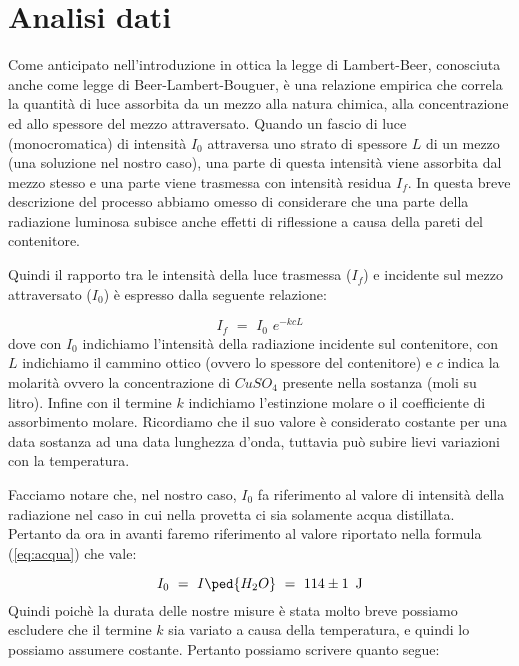 \section{Analisi dati}

Come anticipato nell'introduzione in ottica la legge di Lambert-Beer, conosciuta anche come legge di Beer-Lambert-Bouguer, è una relazione empirica che correla la quantità di luce assorbita da un mezzo alla natura chimica, alla concentrazione ed allo spessore del mezzo attraversato.
Quando un fascio di luce (monocromatica) di intensità $I_0$ attraversa uno strato di spessore $L$ di un mezzo (una soluzione nel nostro caso), una parte di questa intensità viene assorbita dal mezzo stesso e una parte viene trasmessa con intensità residua $I_f$.
In questa breve descrizione del processo abbiamo omesso di considerare che una parte della radiazione luminosa subisce anche effetti di riflessione a causa della pareti del contenitore.

Quindi il rapporto tra le intensità della luce trasmessa ($I_f$) e incidente sul mezzo attraversato ($I_0$) è espresso dalla seguente relazione:

\begin{equation}
	I_f \,\,=\,\, I_0 \,\, e^{-kcL}
	\label{eq:intensita}
\end{equation}
%
dove con $I_0$ indichiamo l'intensità della radiazione incidente sul contenitore, con $L$ indichiamo il cammino ottico (ovvero lo spessore del contenitore) e $c$ indica la molarità ovvero la concentrazione di $CuSO_4$ presente nella sostanza (moli su litro). Infine con il termine $k$ indichiamo l'estinzione molare o il coefficiente di assorbimento molare. Ricordiamo che il suo valore è considerato costante per una data sostanza ad una data lunghezza d'onda, tuttavia può subire lievi variazioni con la temperatura.

Facciamo notare che, nel nostro caso, $I_0$ fa riferimento al valore di intensità della radiazione nel caso in cui nella provetta ci sia solamente acqua distillata. Pertanto da ora in avanti faremo riferimento al valore riportato nella formula (\ref{eq:acqua}) che vale:

\begin{equation}
	I_0 \,\,=\,\, I\ped{H_2O} \,\,=\,\, 114 \pm 1 \,\,\, \si{\joule}
\end{equation}
%
Quindi poichè la durata delle nostre misure è stata molto breve possiamo escludere che il termine $k$ sia variato a causa della temperatura, e quindi lo possiamo assumere costante.
Pertanto possiamo scrivere quanto segue:

